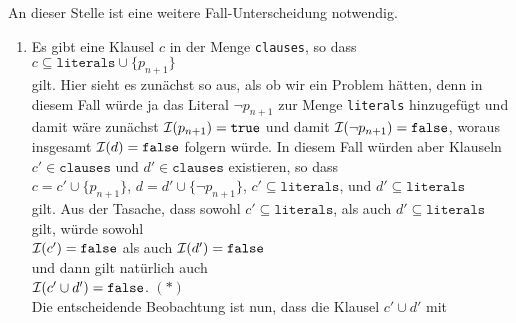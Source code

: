 \begin{enumerate}
\begin{enumerate}
                   An dieser Stelle ist eine weitere Fall-Unterscheidung notwendig.
                   \begin{enumerate}
                   \item Es gibt eine Klausel $c$ in der Menge \texttt{clauses}, so dass
                         \\[0.2cm]
                         \hspace*{1.3cm}
                         $c \subseteq \mathtt{literals} \cup \{p_{n+1}\}$
                         \\[0.2cm]
                         gilt.  Hier sieht es zun\"{a}chst so aus, als ob wir ein Problem h\"{a}tten, denn
                         in diesem Fall w\"{u}rde ja das Literal $\neg p_{n+1}$ zur Menge
                         \texttt{literals} hinzugef\"{u}gt und damit w\"{a}re zun\"{a}chst $\mathcal{I}(p_{n+1}) = \mathtt{true}$ 
                         und damit $\mathcal{I}(\neg p_{n+1}) = \mathtt{false}$, woraus insgesamt 
                         $\mathcal{I}(d) = \mathtt{false}$ folgern w\"{u}rde.  In diesem Fall w\"{u}rden aber
                         Klauseln $c' \in \mathtt{clauses}$ und $d' \in \mathtt{clauses}$  existieren, so dass
                         \\[0.2cm]
                         \hspace*{1.3cm}
                         $c = c' \cup \{p_{n+1}\}$, \quad $d = d' \cup \{ \neg p_{n+1} \}$, \quad
                         $c' \subseteq \mathtt{literals}$,  \quad und \quad $d' \subseteq \mathtt{literals}$
                         \\[0.2cm]
                         gilt. Aus der Tasache, dass sowohl $c' \subseteq \mathtt{literals}$, als auch $d' \subseteq \mathtt{literals}$ 
                         gilt, w\"{u}rde sowohl
                         \\[0.2cm]
                         \hspace*{1.3cm}
                         $\mathcal{I}(c') = \mathtt{false}$ \quad als auch \quad $\mathcal{I}(d') = \mathtt{false}$
                         \\[0.2cm]
                         und dann gilt nat\"{u}rlich auch
                         \\[0.2cm]
                         \hspace*{1.3cm}
                         $\mathcal{I}(c' \cup d') = \mathtt{false}$. \hspace*{\fill} $(*)$
                         \\[0.2cm]
                         Die entscheidende Beobachtung ist nun, dass die Klausel $c' \cup d'$ mit

\end{enumerate}
\end{enumerate}
\end{enumerate}
